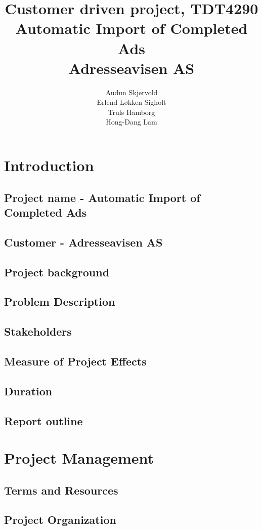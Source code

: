 \documentclass[12pt, a4paper]{article}
\title{\normalsize Customer driven project, TDT4290 \\ \LARGE \textbf{Automatic Import of Completed Ads} \normalsize \\Adresseavisen AS}
\author{Audun Skjervold \\ Erlend Løkken Sigholt \\ Truls Hamborg \\ Hong-Dang Lam}
\begin{document}
\maketitle 
\newpage
\tableofcontents
\newpage
 
\section{Introduction}
\subsection{Project name - Automatic Import of Completed Ads}
\subsection{Customer - Adresseavisen AS}
\subsection{Project background}
\subsection{Problem Description}
\subsection{Stakeholders}
\subsection{Measure of Project Effects}
\subsection{Duration}

\subsection{Report outline}

\section{Project Management}
\subsection{Terms and Resources}
\subsection{Project Organization}
\end{document}
